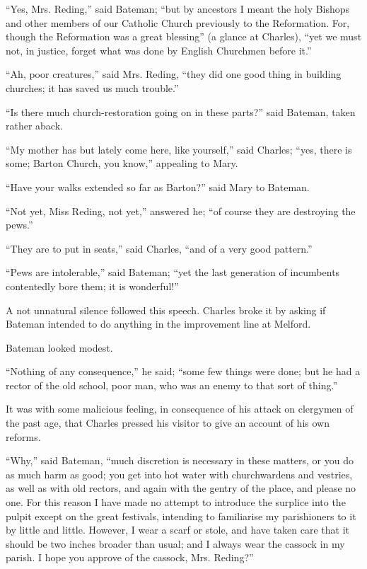 ``Yes, Mrs. Reding,'' said Bateman; ``but by ancestors
I meant the holy Bishops and other members of our Catholic Church
previously to the Reformation. For, though the Reformation was a great
blessing'' (a glance at Charles), ``yet we must not, in
justice, forget what was done by English Churchmen before it.''

``Ah, poor creatures,'' said Mrs. Reding, ``they did
one good thing in building churches; it has saved us much
trouble.''

``Is there much church-restoration going on in these
parts?'' said Bateman, taken rather aback.

``My mother has but lately come here, like yourself,'' said
Charles; ``yes, there is some; Barton Church, you know,''
appealing to Mary.

``Have your walks extended so far as Barton?'' said Mary to
Bateman.

``Not yet, Miss Reding, not yet,'' answered he; ``of
course they are destroying the pews.''

``They are to put in seats,'' said Charles, ``and of a
very good pattern.''

``Pews are intolerable,'' said Bateman; ``yet the last
generation of incumbents contentedly bore them; it is wonderful!''

A not unnatural silence followed this speech. Charles broke it by
asking if Bateman intended to do anything in the improvement line at
Melford.

Bateman looked modest.

``Nothing of any consequence,'' he said; ``some few
things were done; but he had a rector of the old school, poor man, who
was an enemy to that sort of thing.''

It was with some malicious feeling, in consequence of his attack on
clergymen of the past age, that Charles pressed his visitor to give an
account of his own reforms.

``Why,'' said Bateman, ``much discretion is necessary
in these matters, or you do as much harm as good; you get into hot
water with churchwardens and vestries, as well as with old
rectors, and again with the gentry of the place, and please no one.
For this reason I have made no attempt to introduce the surplice into
the pulpit except on the great festivals, intending to familiarise my
parishioners to it by little and little. However, I wear a scarf or
stole, and have taken care that it should be two inches broader than
usual; and I always wear the cassock in my parish. I hope you approve
of the cassock, Mrs. Reding?''

